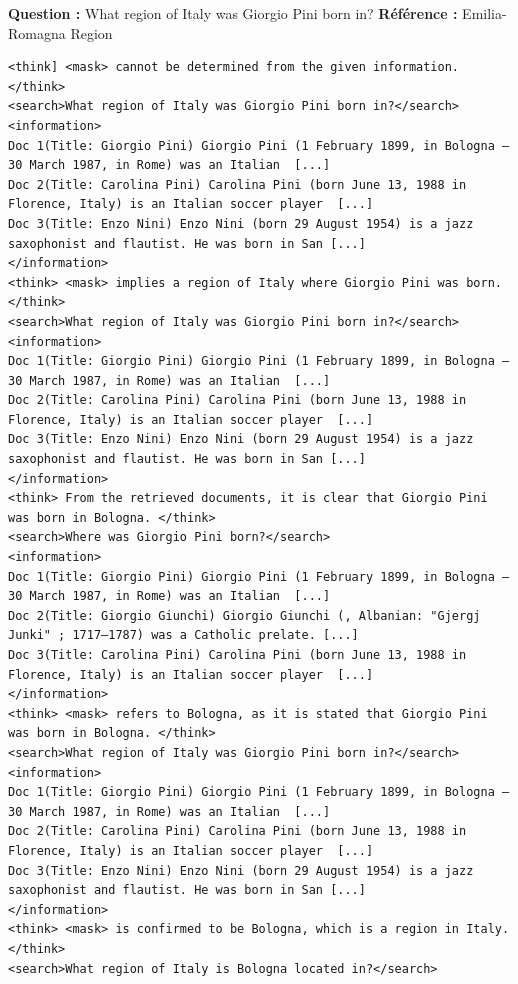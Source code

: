 \noindent\textbf{Question :} What region of Italy was Giorgio Pini born in? \quad \textbf{Référence :} Emilia-Romagna Region
\begin{Verbatim}[breaklines=true, breakanywhere=true, fontsize=\scriptsize, frame=single]
<think] <mask> cannot be determined from the given information. </think>
<search>What region of Italy was Giorgio Pini born in?</search>
<information>
Doc 1(Title: Giorgio Pini) Giorgio Pini (1 February 1899, in Bologna – 30 March 1987, in Rome) was an Italian  [...]
Doc 2(Title: Carolina Pini) Carolina Pini (born June 13, 1988 in Florence, Italy) is an Italian soccer player  [...]
Doc 3(Title: Enzo Nini) Enzo Nini (born 29 August 1954) is a jazz saxophonist and flautist. He was born in San [...]
</information>
<think> <mask> implies a region of Italy where Giorgio Pini was born. </think>
<search>What region of Italy was Giorgio Pini born in?</search>
<information>
Doc 1(Title: Giorgio Pini) Giorgio Pini (1 February 1899, in Bologna – 30 March 1987, in Rome) was an Italian  [...]
Doc 2(Title: Carolina Pini) Carolina Pini (born June 13, 1988 in Florence, Italy) is an Italian soccer player  [...]
Doc 3(Title: Enzo Nini) Enzo Nini (born 29 August 1954) is a jazz saxophonist and flautist. He was born in San [...]
</information>
<think> From the retrieved documents, it is clear that Giorgio Pini was born in Bologna. </think>
<search>Where was Giorgio Pini born?</search>
<information>
Doc 1(Title: Giorgio Pini) Giorgio Pini (1 February 1899, in Bologna – 30 March 1987, in Rome) was an Italian  [...]
Doc 2(Title: Giorgio Giunchi) Giorgio Giunchi (, Albanian: "Gjergj Junki" ; 1717–1787) was a Catholic prelate. [...]
Doc 3(Title: Carolina Pini) Carolina Pini (born June 13, 1988 in Florence, Italy) is an Italian soccer player  [...]
</information>
<think> <mask> refers to Bologna, as it is stated that Giorgio Pini was born in Bologna. </think>
<search>What region of Italy was Giorgio Pini born in?</search>
<information>
Doc 1(Title: Giorgio Pini) Giorgio Pini (1 February 1899, in Bologna – 30 March 1987, in Rome) was an Italian  [...]
Doc 2(Title: Carolina Pini) Carolina Pini (born June 13, 1988 in Florence, Italy) is an Italian soccer player  [...]
Doc 3(Title: Enzo Nini) Enzo Nini (born 29 August 1954) is a jazz saxophonist and flautist. He was born in San [...]
</information>
<think> <mask> is confirmed to be Bologna, which is a region in Italy. </think>
<search>What region of Italy is Bologna located in?</search>
\end{Verbatim}
